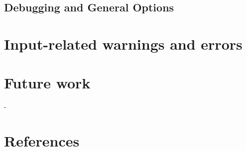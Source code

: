 \documentclass[14pt,a4paper, titlepage]{article}
\begin{document}
\subsection{Debugging and General Options}



\section{Input-related warnings and errors}
\label{sec:inputRelatedWarnings}

\section{Future work}
\label{sec:future}


 \newpage
-\section{References}
\end{document}

